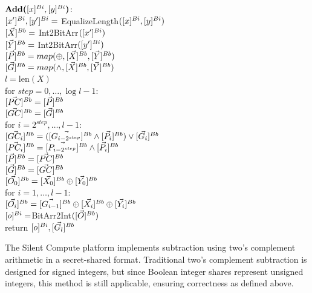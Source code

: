 \begin{protocol}[Addition]

    $\textbf{Add(}[x]^{Bi}, [y]^{Bi}\textbf{)}$:\\
    \indent $[x']^{Bi}, [y']^{Bi}=$ EqualizeLength$([x]^{Bi}, [y]^{Bi})$ \\
    \indent $[\vec{X}]^{Bb} = $ Int2BitArr$([x']^{Bi})$ \\
    \indent $[\vec{Y}]^{Bb} = $ Int2BitArr$([y']^{Bi})$ \\
    \indent $[\vec{P}]^{Bb} = map(\oplus, [\vec{X}]^{Bb}, [\vec{Y}]^{Bb})$ \\
    \indent $[\vec{G}]^{Bb} = map(\wedge, [\vec{X}]^{Bb}, [\vec{Y}]^{Bb})$ \\
    \indent $l=$len$(X)$ \\
    \indent for $step=0,\ldots,\log {l} - 1$: \\
    \indent \indent $[\vec{PC}]^{Bb} = [\vec{P}]^{Bb}$ \\
    \indent \indent $[\vec{GC}]^{Bb} = [\vec{G}]^{Bb}$ \\
    \indent \indent for $i=2^{step},\ldots,l - 1$: \\
    \indent \indent \indent $[\vec{GC_i}]^{Bb} = ([\vec{G_{i - 2^{step}}}]^{Bb} \wedge [\vec{P_i}]^{Bb}) \vee [\vec{G_i}]^{Bb}$ \\
    \indent \indent \indent $[\vec{PC_i}]^{Bb} = [\vec{P_{i - 2^{step}}}]^{Bb} \wedge [\vec{P_i}]^{Bb}$ \\
    \indent \indent $[\vec{P}]^{Bb} = [\vec{PC}]^{Bb}$ \\
    \indent \indent $[\vec{G}]^{Bb} = [\vec{GC}]^{Bb}$ \\
    \indent $[\vec{O_0}]^{Bb} = [\vec{X_0}]^{Bb} \oplus [\vec{Y_0}]^{Bb}$ \\
    \indent for $i=1,\ldots,l-1$: \\
    \indent \indent $[\vec{O_i}]^{Bb} = [\vec{G_{i - 1}}]^{Bb} \oplus [\vec{X_i}]^{Bb} \oplus [\vec{Y_i}]^{Bb}$  \\
    \indent $[o]^{Bi} = $BitArr2Int$([\vec{O}]^{Bb})$ \\
    \indent return $[o]^{Bi}, [\vec{G_l}]^{Bb}$
\end{protocol}

The Silent Compute platform implements subtraction using two’s complement arithmetic \cite{Wiki2sComp} in a secret-shared format. Traditional two’s complement subtraction is designed for signed integers, but since Boolean integer shares represent unsigned integers, this method is still applicable, ensuring correctness as defined above.


